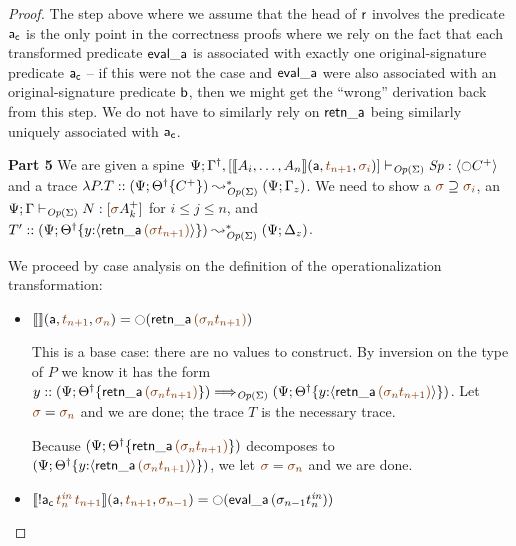 \begin{proof}
The step above where we assume that the head of ${\sf r}$ involves the
predicate ${\sf a_c}$ is the only point in the correctness proofs where
we rely on the fact that each transformed predicate ${\sf eval\_a}$ is
associated with exactly one original-signature predicate ${\sf a_c}$ --
if this were not the case and ${\sf eval\_a}$ were also associated
with an original-signature predicate ${\sf b}$, then we might get the
``wrong'' derivation back from this step. We do not have to similarly
rely on ${\sf retn\_a}$ being similarly uniquely associated with ${\sf
  a_c}$.


\bigskip\noindent
{\bf Part 5}
We are given a spine
$\slst{\transop{\Sigma}}{\Psi}
  {\opsubst{\Gamma},[\opbasic{A_i,\ldots,A_n}{t_{n+1}}{\sigma_i}]}
  {\Sp}{\susp{{\ocircle}C^+}}$ and a trace
$\lambda P.T :: (\Psi; {{{\Theta}^\dag}}\{{C^+}\})
         \leadsto^*_{{\it Op}({\Sigma})}
       (\Psi; \Gamma_z)$. 
We need to show a $\lf{\sigma} \supseteq \lf{\sigma_i}$, an
$\slst{\transop{\Sigma}}{\Psi}{\Gamma}{N}{[\lf\sigma A^+_k]}$
for $i \leq j \leq n$, and 
$T' :: (\Psi; \tackon{\opsubst{\Theta}}{y{:}\susp{{\sf retn\_a}\,\lf{(\lf{\sigma t_{n+1}})}}})
  \leadsto^*_{\transop{\Sigma}}
 (\Psi; \Delta_z)$.

We proceed by case analysis on the definition of
the operationalization transformation:
\smallskip
\begin{itemize}
\item $\opbasic{}{t_{n+1}}{\sigma_n} = {\ocircle}({\sf retn\_a}\,\lf{(\sigma_{n}{t_{n+1}})})$

  \medskip
  This is a base case: there are no values to construct. By inversion on the
  type of $P$ we know it has the form
  $y :: (\Psi; \tackon{\opsubst{\Theta}}{{\sf retn\_a}\,\lf{(\sigma_{n}{t_{n+1}})}}) \Longrightarrow_{\transop{\Sigma}} (\Psi; \tackon{\opsubst{\Theta}}{y{:}\susp{{\sf retn\_a}\,\lf{(\sigma_{n}{t_{n+1}})}}})$. 
  Let $\lf{\sigma} = \lf{\sigma_n}$
  and we are done; the trace $T$ is the necessary trace. 
  
  \smallskip
  Because
  $(\Psi; \tackon{\opsubst{\Theta}}{{\sf retn\_a}\,\lf{(\sigma_{n}{t_{n+1}})}})$
  decomposes to 
  $(\Psi; \tackon{\opsubst{\Theta}}{y{:}\susp{{\sf retn\_a}\,\lf{(\sigma_{n}{t_{n+1}})}}})$, we let $\lf{\sigma} = \lf{\sigma_n}$ and we are done.
  \medskip

\item $\opbasic{{!}{\sf a_c}\,\lf{t^{\it in}_n}\,\lf{t_{n+1}}}{t_{n+1}}{\sigma_{n-1}} 
  = {\ocircle}({\sf eval\_a}\,(\sigma_{n-1}{t^{\it in}_n}))$


\end{itemize}
\end{proof}
